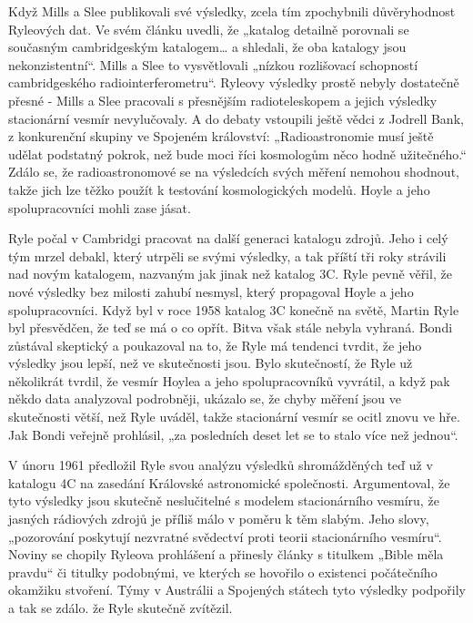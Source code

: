   Když Mills a Slee publikovali své výsledky, zcela tím zpochybnili důvěryhodnost Ryleových dat. Ve
  svém článku uvedli, že „katalog detailně porovnali se současným cambridgeským katalogem… a
  shledali, že oba katalogy jsou nekonzistentní“. Mills a Slee to vysvětlovali „nízkou rozlišovací
  schopností cambridgeského radiointerferometru“. Ryleovy výsledky prostě nebyly dostatečně přesné -
  Mills a Slee pracovali s přesnějším radioteleskopem a jejich výsledky stacionární vesmír
  nevylučovaly. A do debaty vstoupili ještě vědci z Jodrell Bank, z konkurenční skupiny ve Spojeném
  království: „Radioastronomie musí ještě udělat podstatný pokrok, než bude moci říci kosmologům
  něco hodně užitečného.“ Zdálo se, že radioastronomové se na výsledcích svých měření nemohou
  shodnout, takže jich lze těžko použít k testování kosmologických modelů. Hoyle a jeho
  spolupracovníci mohli zase jásat. 

  Ryle počal v Cambridgi pracovat na další generaci katalogu zdrojů. Jeho i celý tým mrzel debakl,
  který utrpěli se svými výsledky, a tak příští tři roky strávili nad novým katalogem, nazvaným jak
  jinak než katalog 3C. Ryle pevně věřil, že nové výsledky bez milosti zahubí nesmysl, který
  propagoval Hoyle a jeho spolupracovníci. Když byl v roce 1958 katalog 3C konečně na světě, Martin
  Ryle byl přesvědčen, že teď se má o co opřít. Bitva však stále nebyla vyhraná. Bondi zůstával
  skeptický a poukazoval na to, že Ryle má tendenci tvrdit, že jeho výsledky jsou lepší, než ve
  skutečnosti jsou. Bylo skutečností, že Ryle už několikrát tvrdil, že vesmír Hoylea a jeho
  spolupracovníků vyvrátil, a když pak někdo data analyzoval podrobněji, ukázalo se, že chyby měření
  jsou ve skutečnosti větší, než Ryle uváděl, takže stacionární vesmír se ocitl znovu ve hře. Jak
  Bondi veřejně prohlásil, „za posledních deset let se to stalo více než jednou“. 

  V únoru 1961 předložil Ryle svou analýzu výsledků shromážděných teď už v katalogu 4C na zasedání
  Královské astronomické společnosti. Argumentoval, že tyto výsledky jsou skutečně neslučitelné s
  modelem stacionárního vesmíru, že jasných rádiových zdrojů je příliš málo v poměru k těm slabým.
  Jeho slovy, „pozorování poskytují nezvratné svědectví proti teorii stacionárního vesmíru“. Noviny
  se chopily Ryleova prohlášení a přinesly články s titulkem „Bible měla pravdu“ či titulky
  podobnými, ve kterých se hovořilo o existenci počátečního okamžiku stvoření. Týmy v Austrálii a
  Spojených státech tyto výsledky podpořily a tak se zdálo. že Ryle skutečně zvítězil. 


